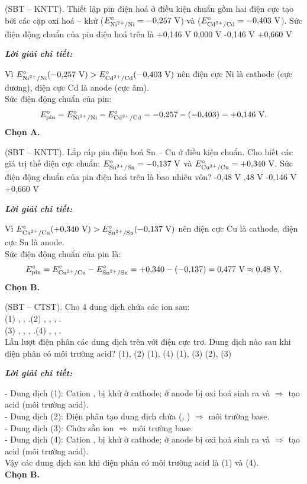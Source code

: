 \documentclass[11pt,a4paper]{article}
\def\loigiai#1{
\par\begingroup\color{blue!80!black}\small
\noindent\textbf{\textit{Lời giải chi tiết:}}\par
#1\par\endgroup}
\begin{document}
\begin{ex}
(SBT – KNTT). Thiết lập pin điện hoá ở điều kiện chuẩn gồm hai điện cực tạo bởi các cặp oxi hoá -- khử  ($E^\circ_{\ce{Ni^2+/Ni}} = -0{,}257\text{ V}$) và  ($E^\circ_{\ce{Cd^2+/Cd}} = -0{,}403\text{ V}$). Sức điện động chuẩn của pin điện hoá trên là
\choice
{\True +0,146 V}
{0,000 V}
{-0,146 V}
{+0,660 V}
\loigiai{
Vì $E^\circ_{\ce{Ni^2+/Ni}} (-0{,}257\text{ V}) > E^\circ_{\ce{Cd^2+/Cd}} (-0{,}403\text{ V})$ nên điện cực Ni là cathode (cực dương), điện cực Cd là anode (cực âm).\\
Sức điện động chuẩn của pin:
$$E^\circ_{\text{pin}} = E^\circ_{\ce{Ni^2+/Ni}} - E^\circ_{\ce{Cd^2+/Cd}} = -0{,}257 - (-0{,}403) = +0{,}146\text{ V.}$$
\textbf{Chọn A.}}
\end{ex}

\begin{ex}
(SBT – KNTT). Lắp ráp pin điện hoá Sn -- Cu ở điều kiện chuẩn. Cho biết các giá trị thế điện cực chuẩn: $E^\circ_{\ce{Sn^2+/Sn}} = -0{,}137\text{ V}$ và $E^\circ_{\ce{Cu^2+/Cu}} = +0{,}340\text{ V}$. Sức điện động chuẩn của pin điện hoá trên là bao nhiêu vôn?
\choice
{-0,48 V}
{,48 V}
{-0,146 V}
{+0,660 V}
\loigiai{
Vì $E^\circ_{\ce{Cu^2+/Cu}} (+0{,}340\text{ V}) > E^\circ_{\ce{Sn^2+/Sn}} (-0{,}137\text{ V})$ nên điện cực Cu là cathode, điện cực Sn là anode.\\
Sức điện động chuẩn của pin là:
$$E^\circ_{\text{pin}} = E^\circ_{\ce{Cu^2+/Cu}} - E^\circ_{\ce{Sn^2+/Sn}} = +0{,}340 - (-0{,}137) = 0{,}477\text{ V} \approx 0{,}48\text{ V.}$$
\textbf{Chọn B.}}
\end{ex}

\begin{ex}
(SBT – CTST). Cho 4 dung dịch chứa các ion sau:\\
(1) , , .\qquad (2) , , , .\\
(3) , , , .\qquad (4) , , .\\
Lần lượt điện phân các dung dịch trên với điện cực trơ. Dung dịch nào sau khi điện phân có môi trường acid?
\choice
{(1), (2)}
{\True (1), (4)}
{(1), (3)}
{(2), (3)}
\loigiai{
- Dung dịch (1): Cation ,  bị khử ở cathode; ở anode \ce{H2O} bị oxi hoá sinh ra \ce{H+} và \ce{O2} $\Rightarrow$ tạo acid \ce{HNO3} (môi trường acid).\\
- Dung dịch (2): Điện phân tạo dung dịch chứa \ce{OH-} (\ce{NaOH}, \ce{KOH}) $\Rightarrow$ môi trường base.\\
- Dung dịch (3): Chứa sẵn ion \ce{OH-} $\Rightarrow$ môi trường base.\\
- Dung dịch (4): Cation \ce{Cu^2+}, \ce{Zn^2+} bị khử ở cathode; ở anode \ce{H2O} bị oxi hoá sinh ra \ce{H+} và \ce{O2} $\Rightarrow$ tạo acid \ce{H2SO4} (môi trường acid).\\
Vậy các dung dịch sau khi điện phân có môi trường acid là (1) và (4).\\
\textbf{Chọn B.}}
\end{ex}
\end{document}

